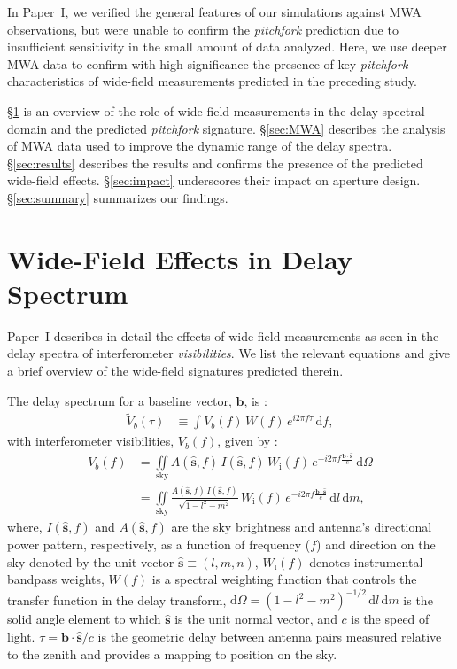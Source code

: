 \documentclass[preprint2,apjl,numberedappendix,twocolappendix,appendixfloats]{emulateapj}
\newcommand{\dif}{\mathrm{d}}
\begin{document}
In Paper~I, we verified the general features of our simulations against MWA observations, but were unable to confirm the {\it pitchfork} prediction due to insufficient sensitivity in the small amount of data analyzed. Here, we use deeper MWA data to confirm with high significance the presence of key {\it pitchfork} characteristics of wide-field measurements predicted in the preceding study.  

\S\ref{sec:wide-field} is an overview of the role of wide-field measurements in the delay spectral domain and the predicted {\it pitchfork} signature. \S\ref{sec:MWA} describes the analysis of MWA data used to improve the dynamic range of the delay spectra. \S\ref{sec:results} describes the results and confirms the presence of the predicted wide-field effects. \S\ref{sec:impact} underscores their impact on aperture design. \S\ref{sec:summary} summarizes our findings.

\section{Wide-Field Effects in Delay Spectrum}\label{sec:wide-field}

Paper~I describes in detail the effects of wide-field measurements as seen in the delay spectra of interferometer {\it visibilities}. We list the relevant equations and give a brief overview of the wide-field signatures predicted therein. 

The delay spectrum for a baseline vector, $\boldsymbol{b}$, is \citep[][Paper~I]{par12a,par12b,thy13}: 
\begin{align}\label{eqn:delay-spectrum}
  \widetilde{V}_b(\tau) &\equiv \int V_b(f)\,W(f)\,e^{i2\pi f\tau}\,\dif f,
\end{align}
with interferometer visibilities, $V_b(f)$, given by \citep{van34,zer38,tho01}:
\begin{align} 
  V_b(f) &= \iint\limits_\textrm{sky} A(\hat{\boldsymbol{s}},f)\,I(\hat{\boldsymbol{s}},f)\,W_\textrm{i}(f)\,e^{-i2\pi f\frac{\boldsymbol{b}\cdot\hat{\boldsymbol{s}}}{c}}\,\dif\Omega \label{eqn:vis1}\\
         &= \iint\limits_\textrm{sky} \frac{A(\hat{\boldsymbol{s}},f)\,I(\hat{\boldsymbol{s}},f)}{\sqrt{1-l^2-m^2}}\,W_\textrm{i}(f)\,e^{-i2\pi f\frac{\boldsymbol{b}\cdot\hat{\boldsymbol{s}}}{c}}\,\dif l\,\dif m, \label{eqn:vis2}
\end{align}
where, $I(\hat{\boldsymbol{s}},f)$ and $A(\hat{\boldsymbol{s}},f)$ are the sky brightness and antenna's directional power pattern, respectively, as a function of frequency ($f$) and direction on the sky denoted by the unit vector $\hat{\boldsymbol{s}}\equiv (l,m,n)$, $W_\textrm{i}(f)$ denotes instrumental bandpass weights, $W(f)$ is a spectral weighting function that controls the transfer function in the delay transform, $\dif\Omega=(1-l^2-m^2)^{-1/2}\,\dif l\,\dif m$ is the solid angle element to which $\hat{\boldsymbol{s}}$ is the unit normal vector, and $c$ is the speed of light. $\tau=\boldsymbol{b}\cdot\hat{\boldsymbol{s}}/c$ is the geometric delay between antenna pairs measured relative to the zenith and provides a mapping to position on the sky.
\end{document}
